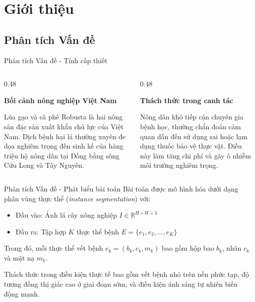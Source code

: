 \section{Giới thiệu}

\subsection{Phân tích Vấn đề}
\begin{frame}{Phân tích Vấn đề - Tính cấp thiết}
    \begin{columns}[t]
        \begin{column}{0.48\textwidth}
            \justifying
            \centerline{\textbf{Bối cảnh nông nghiệp Việt Nam}}
            \vspace{0.3cm}
            
            Lúa gạo và cà phê Robusta là hai nông sản đặc sản xuất khẩu chủ lực của Việt Nam. Dịch bệnh hại lá thường xuyên đe dọa nghiêm trọng đến sinh kế của hàng triệu hộ nông dân tại Đồng bằng sông Cửu Long và Tây Nguyên.
        \end{column}
        \begin{column}{0.48\textwidth}
            \justifying
            \centerline{\textbf{Thách thức trong canh tác}}
            \vspace{0.3cm}
            
            Nông dân khó tiếp cận chuyên gia bệnh học, thường chẩn đoán cảm quan dẫn đến sử dụng sai hoặc lạm dụng thuốc bảo vệ thực vật. Điều này làm tăng chi phí và gây ô nhiễm môi trường nghiêm trọng.
        \end{column}
    \end{columns}
\end{frame}

\begin{frame}{Phân tích Vấn đề - Phát biểu bài toán}
    Bài toán được mô hình hóa dưới dạng phân vùng thực thể (\textit{instance segmentation}) với:
    \vspace{0.2cm}
    \begin{itemize}
        \item[-] Đầu vào: Ảnh lá cây nông nghiệp $I \in \mathbb{R}^{H \times W \times 3}$
        \item[-] Đầu ra: Tập hợp $K$ thực thể bệnh $E = \{e_1, e_2, \dots, e_K\}$
    \end{itemize}
    \vspace{0.2cm}
    Trong đó, mỗi thực thể vết bệnh $e_k = (b_k, c_k, m_k)$ bao gồm hộp bao $b_k$, nhãn $c_k$ và mặt nạ $m_k$.
    
    \vspace{0.3cm}
    Thách thức trong điều kiện thực tế bao gồm vết bệnh nhỏ trên nền phức tạp, độ tương đồng thị giác cao ở giai đoạn sớm, và điều kiện ánh sáng tự nhiên biến động mạnh.
\end{frame}


